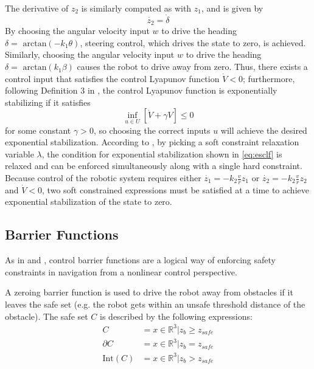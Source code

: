 \documentclass[conference]{IEEEtran}
\begin{document}
The derivative of $z_2$ is similarly computed as with $z_1$, and is given by \begin{equation}\dot{z_2} = \dot{\delta} \end{equation}
By choosing the angular velocity input $w$ to drive the heading $\delta=\text{ arctan}(-k_1\theta)$, steering control, which drives the state to zero, is achieved. Similarly, choosing the angular velocity input $w$ to drive the heading $\delta=\text{ arctan}(k_1\beta)$ causes the robot to drive away from zero. Thus, there exists a control input that satisfies the control Lyapunov function $\dot{V}<0$; furthermore, following Definition 3 in \cite{ames2014esclf}, the control Lyapunov function is exponentially stabilizing if it satisfies
\begin{equation}
\inf_{u\in U}\left[ \dot{V}+\gamma V \right] \leq 0
\label{eq:esclf}
\end{equation}
for some constant $\gamma >0$, so choosing the correct inputs $u$ will achieve the desired exponential stabilization. According to \cite{amesACC}, by picking a soft constraint relaxation variable $\lambda$, the condition for exponential stabilization shown in \eqref{eq:esclf} is relaxed and can be enforced simultaneously along with a single hard constraint. Because control of the robotic system requires either $\dot{z_1}=-k_2\frac{v}{r}z_1$ or $\dot{z_2}=-k_2\frac{v}{r}z_2$ and $\dot{V}<0$, two soft constrained expressions must be satisfied at a time to achieve exponential stabilization of the state to zero.

\subsection{Barrier Functions}
As in \cite{amesACC} and \cite{ames2014esclf}, control barrier functions are a logical way of enforcing safety constraints in navigation from a nonlinear control perspective. 

A zeroing barrier function is used to drive the robot away from obstacles if it leaves the safe set (e.g. the robot gets within an unsafe threshold distance of the obstacle). The safe set $C$ is described by the following expressions:
\begin{align}
C &= {x \in \mathbb{R}^3 | z_b\geq z_{safe}}\\
\partial C &= {x \in \mathbb{R}^3 | z_b=z_{safe}}\\
\text{Int}(C) &= {x \in \mathbb{R}^3 | z_b > z_{safe}}
\end{align}
\end{document}
